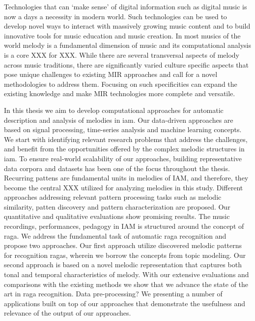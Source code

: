 Technologies that can `make sense' of digital information such as digital music is now a days a necessity in modern world. Such technologies can be used to develop novel ways to interact with massively growing music content and to build innovative tools for music education and music creation. In most musics of the world melody is a fundamental dimension of music and its computational analysis is a core XXX for XXX. While there are several transversal aspects of melody across music traditions, there are significantly varied culture specific aspects that pose unique challenges to existing MIR approaches and call for a novel methodologies to address them. Focusing on such specificities can expand the existing knowledge and make MIR technologies more complete and versatile. 

In this thesis we aim to develop computational approaches for automatic description and analysis of melodies in \gls{iam}. Our data-driven approaches are based on signal processing, time-series analysis and machine learning concepts. We start with identifying relevant research problems that address the challenges, and benefit from the opportunities offered by the complex melodic structures in \gls{iam}. To ensure real-world scalability of our approaches, building representative data corpora and datasets has been one of the focus throughout the thesis. Recurring pattens are fundamental units in melodies of IAM, and therefore, they become the central XXX utilized for analyzing melodies in this study. Different approaches addressing relevant pattern processing tasks such as melodic similarity, patten discovery and pattern characterization are proposed. Our quantitative and qualitative evaluations show promising results. The music recordings, performances, pedagogy in IAM is structured around the concept of raga. We address the fundamental task of automatic raga recognition and propose two approaches. Our first approach utilize discovered melodic patterns for recognition ragas, wherein we borrow the concepts from topic modeling. Our second approach is based on a novel melodic representation that captures both tonal and temporal characteristics of melody. With our extensive evaluations and comparisons with the existing methods we show that we advance the state of the art in raga recognition. Data pre-processing? We presenting a number of applications built on top of our approaches that demonstrate the usefulness and relevance of the output of our approaches. 



